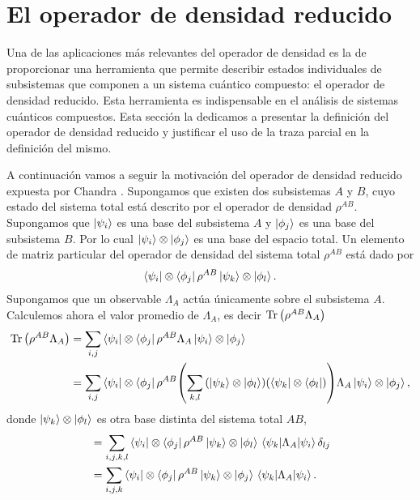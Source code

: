 \section{El operador de densidad reducido} %
Una de las aplicaciones más relevantes del operador de densidad es  
la de proporcionar una herramienta que permite
describir estados individuales de subsistemas que componen a un sistema
cuántico compuesto: el operador de
densidad reducido. Esta herramienta es indispensable en el 
análisis de sistemas cuánticos compuestos. Esta sección la 
dedicamos a presentar la definición del operador de densidad reducido
y justificar el uso de la traza parcial en la definición del mismo.

A continuación vamos a seguir la motivación del operador 
de densidad reducido expuesta por Chandra \cite{chandra2013quantum}. 
Supongamos que existen dos subsistemas $A$ y $B$, cuyo estado del 
sistema total está 
descrito por el operador de densidad $\rho^{AB}$. Supongamos que 
$\ket{\psi_i}$ es una base del subsistema $A$ y $\ket{\phi_j}$ es
una base del subsistema $B$. Por lo cual $\ket{\psi_i}\otimes \ket{\phi_j}$
es una base del espacio total. Un elemento de matriz particular 
del operador de densidad del sistema total $\rho^{AB}$ está dado por
\begin{align}
	\bra{\psi_i}\otimes\bra{\phi_j}\rho^{AB}\ket{\psi_k}\otimes\ket{\phi_l}.
\end{align}
Supongamos que un observable $\Lambda_A$ actúa únicamente sobre el 
subsistema $A$.
Calculemos ahora el valor promedio de $\Lambda_A$, es decir
$\Tr\qty(\rho^{AB}\Lambda_A)$
\begin{align}
	\Tr \qty(\rho^{AB}\Lambda_A) &= \sum _{i,j} 
	\bra{\psi_i}\otimes\bra{\phi_j}\rho^{AB}\Lambda_A\ket{\psi_i}\otimes\ket{\phi_j} \\
	&= \sum _{i,j} 
	\bra{\psi_i}\otimes\bra{\phi_j}\rho^{AB}
	\qty(\sum _{k,l} \qty(\ket{\psi_k}\otimes\ket{\phi_l})
	\qty(\bra{\psi_k}\otimes\bra{\phi_l}))
	\Lambda_A\ket{\psi_i}\otimes\ket{\phi_j},
\end{align}
donde $\ket{\psi_k}\otimes\ket{\phi_l}$ es otra base distinta 
del sistema total $AB$,
\begin{align}
	&= \sum _{i,j,k,l} 
	\bra{\psi_i}\ten\bra{\phi_j}\rho^{AB}\ket{\psi_k}\ten\ket{\phi_l}
	\matrixel{\psi_k}{\Lambda_A}{\psi_i}\delta _{lj} \\
	&= \sum _{i,j,k} 
	\bra{\psi_i}\ten\bra{\phi_j}\rho^{AB}\ket{\psi_k}\ten\ket{\phi_j}
	\matrixel{\psi_k}{\Lambda_A}{\psi_i}. \label{eq:almost-reducedRho}
\end{align}
